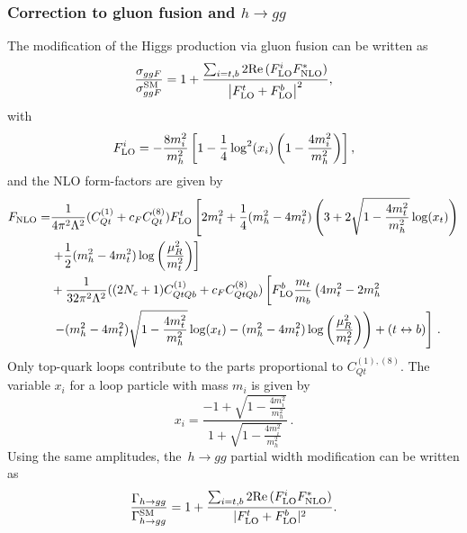 		 \subsubsection{Correction to gluon fusion and $h\to gg $ } 
	\par 	The modification of the Higgs production via gluon fusion can be written as
		\begin{equation}
			\frac{\sigma_{ggF}}{\sigma_{ggF}^{\mathrm{SM}}}= 1+ \frac{ \sum_{i=t,b} 2 \mbox{Re}\,(F_{\textrm{LO}}^i F^*_{\textrm{NLO}})}{\left| F_{\textrm{LO}}^t+F_{\textrm{LO}}^b  \right|^2}, \label{eq:production}
		\end{equation}
		with 
		\begin{equation}
			F_{\textrm{LO}}^i=-\frac{8m_i^2}{m_h^2}\left[1-\frac{1}{4}\log^2(x_i)\left(1-\frac{4m_i^2}{m_h^2}\right)\right],
		\end{equation}
		and the NLO form-factors are given by
		\begin{equation}
			\begin{split}
				F_{\textrm{NLO}}=&\frac{ 1}{4\pi^2  \Lambda^2}(C_{Qt}^{(1)}+c_FC_{Qt}^{(8)})F_{\textrm{LO}}^t \left[ 2 m_t^2  +\frac{1}{4} (m_h^2-4 m_t^2) \left( 3 +2 \sqrt{1-\frac{4 m_t^2}{m_h^2}} \log(x_t) \right)  \right. \\ & \left.
				+\frac{1}{2} (m_h^2-4 m_t^2) \log\left(\frac{\mu_R^2}{m_t^2}\right)\right] \\ & + 
				\frac{1}{32 \pi^2 \Lambda^2} ((2N_c+1)C_{QtQb}^{(1)}+c_FC_{QtQb}^{(8)}) \left[ F_{\textrm{LO}}^b \frac{m_t}{m_b}\left( 4 m_t^2-2 m_h^2 \right. \right.\\ & \left. \left. - (m_h^2-4 m_t^2)\sqrt{1-\frac{4 m_t^2}{m_h^2}} \log(x_t)-(m_h^2-4 m_t^2)\log\left(\frac{\mu_R^2}{m_t^2}\right)\right) +(t\leftrightarrow b)\right]  \,. \label{eq:FNLO}
			\end{split}
		\end{equation}
		Only top-quark loops contribute to the parts proportional to $C_{Qt}^{(1),(8)}$. 
		The variable $x_i$ for a loop particle with mass $m_i$ is given by
		\begin{equation}
			x_i=\frac{-1+\sqrt{1-\frac{4 m_i^2}{m_h^2}}}{1+\sqrt{1-\frac{4 m_i^2}{m_h^2}}}\,. \label{eq:xvariable}
		\end{equation} 
		Using the same amplitudes, the~$ h \to gg$  partial width modification  can be written as
		\begin{equation}
			\frac{\Gamma_{h\to gg}}{\Gamma_{h\to gg}^{\mathrm{SM}}}= 1+ \frac{ \sum_{i=t,b} 2 \mbox{Re}\,(F_{\textrm{LO}}^i F^*_{\textrm{NLO}})}{ |F_{\textrm{LO}}^t+F_{\textrm{LO}}^b|^2}.
		\end{equation}
